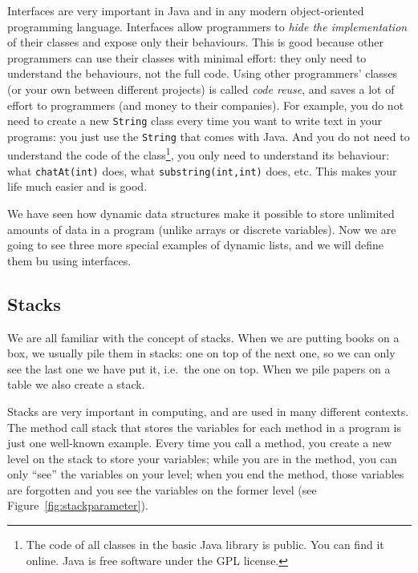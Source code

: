 Interfaces are very important in Java and in any modern
object-oriented programming language. Interfaces allow programmers to
\emph{hide the implementation} of their classes and expose only their
behaviours. This is good because other programmers can use their
classes with minimal effort: they only need to understand the
behaviours, not the full code. Using other programmers' classes (or
your own between different projects) is called \emph{code reuse}, and
saves a lot of effort to programmers (and money to their
companies). For example, you do not need to 
create a new \verb+String+ class every
time you want to write text in your programs: you just use the
\verb+String+ that comes with Java. And you do not need to understand
the code of the class\footnote{The code of all classes in the basic
  Java library is public. You can find it online. Java is free
  software under the GPL license.}, you only need to understand its
behaviour: what \verb+chatAt(int)+ does, what
\verb+substring(int,int)+ does, etc. This makes your life much easier
and is good. 

We have seen how dynamic data structures make it possible to store
unlimited amounts of data in a program (unlike arrays or discrete
variables). Now we are going to see three more special examples of
dynamic lists, and we will define them bu using interfaces. 

\subsection{Stacks}
\label{sec:stacks}

We are all familiar with the concept of stacks. When we are putting
books on a box, we usually pile them in stacks: one on top of the
next one, so we can only see the last one we have put it, i.e.~the one
on top. When we pile papers on a table we also create a stack. 

Stacks are very important in computing, and are used in many different
contexts. The method call stack that stores the variables for each
method in a program is just one well-known example. Every time you
call a method, you create a new level on the stack to store your
variables; while you are in the method, you can only ``see'' the
variables on your level; when you end the method, those variables are
forgotten and you see the variables on the former level (see
Figure~\ref{fig:stackparameter}).  

